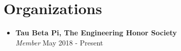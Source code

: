 \documentclass[letterpaper,11pt]{article}
\newcommand{\resumeCourse}[3]{
  \item
    \textbf{#1} \\
    {\small #2, #3} \vspace{-5pt}
}
\newcommand{\resumeOrganization}[3]{
  \item
    \textbf{#1} \\
    \textit{#2} \hfill #3 \vspace{-5pt}
}
\newcommand{\resumeSubHeadingListStart}{\begin{itemize}[leftmargin=0.0in, label={}]}
\newcommand{\resumeSubHeadingListEnd}{\end{itemize}}
\begin{document}

\section{Organizations}
  \resumeSubHeadingListStart
    \resumeOrganization
      {Tau Beta Pi, The Engineering Honor Society}{Member}{May 2018 - Present}
  \resumeSubHeadingListEnd
\vspace{-10pt}
\end{document}
